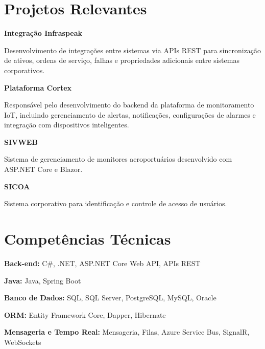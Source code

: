 \documentclass[11pt,a4paper]{article}
\begin{document}
\section{Projetos Relevantes}

\textbf{Integração Infraspeak}

Desenvolvimento de integrações entre sistemas via APIs REST para sincronização de ativos, ordens de serviço, falhas e propriedades adicionais entre sistemas corporativos.

\vspace{0.4cm}

\textbf{Plataforma Cortex}

Responsável pelo desenvolvimento do backend da plataforma de monitoramento IoT, incluindo gerenciamento de alertas, notificações, configurações de alarmes e integração com dispositivos inteligentes.

\vspace{0.4cm}

\textbf{SIVWEB}

Sistema de gerenciamento de monitores aeroportuários desenvolvido com ASP.NET Core e Blazor.

\vspace{0.4cm}

\textbf{SICOA}

Sistema corporativo para identificação e controle de acesso de usuários.

\section{Competências Técnicas}

\textbf{Back-end:} C\#, .NET, ASP.NET Core Web API, APIs REST

\vspace{0.3cm}

\textbf{Java:} Java, Spring Boot

\vspace{0.3cm}

\textbf{Banco de Dados:} SQL, SQL Server, PostgreSQL, MySQL, Oracle

\vspace{0.3cm}

\textbf{ORM:} Entity Framework Core, Dapper, Hibernate

\vspace{0.3cm}

\textbf{Mensageria e Tempo Real:} Mensageria, Filas, Azure Service Bus, SignalR, WebSockets
\end{document}
